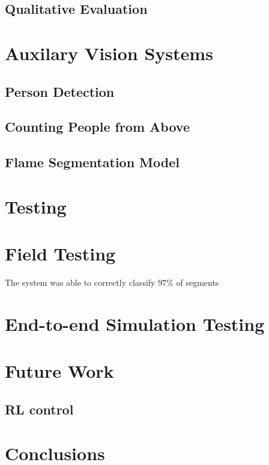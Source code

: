   \subsection{Qualitative Evaluation}\label{sec:gradcam}

\section{Auxilary Vision Systems}\label{sec:other}

  \subsection{Person Detection}

  \subsection{Counting People from Above}

  \subsection{Flame Segmentation Model}

\section{Testing}

  \section{Field Testing}

  The system was able to correctly classify $97\%$ of segments

  \section{End-to-end Simulation Testing}

\section{Future Work}\label{sec:future_work}

  \subsection{RL control}

\section{Conclusions}\label{sec:conclusions}



